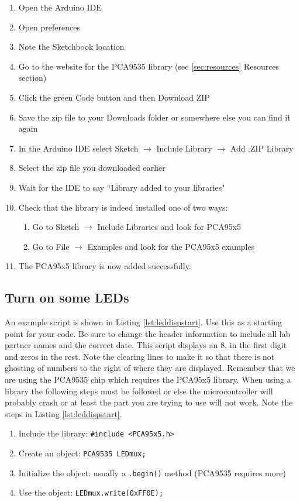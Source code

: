 \begin{enumerate}
    \item Open the Arduino IDE 
    \item Open preferences
    \item Note the Sketchbook location 
    \item Go to the website for the PCA9535 library (see \ref{sec:resources} Resources section)
    \item Click the green Code button and then Download ZIP
    \item Save the zip file to your Downloads folder or somewhere else you can find it again
    \item In the Arduino IDE select Sketch $\rightarrow$ Include Library $\rightarrow$ Add .ZIP Library
    \item Select the zip file you downloaded earlier
    \item Wait for the IDE to say ``Library added to your libraries"
    \item Check that the library is indeed installed one of two ways:
    \begin{enumerate}
        \item Go to Sketch $\rightarrow$ Include Libraries and look for PCA95x5
        \item Go to File $\rightarrow$ Examples and look for the PCA95x5 examples
    \end{enumerate}
    \item The PCA95x5 library is now added successfully.
\end{enumerate}

\subsection{Turn on some LEDs}
An example script is shown in Listing \ref{lst:leddispstart}. Use this as a starting point for your
code. Be sure to change the header information to include all lab partner names and the correct 
date. This script displays an 8. in the first digit and zeros in the rest. Note the clearing
lines to make it so that there is not ghosting of numbers to the right of where they are displayed. 
Remember that we are using the PCA9535 chip which requires the PCA95x5 library. When using a library 
the following steps must be followed or else the microcontroller will probably crash or at least 
the part you are trying to use will not work. Note the steps in Listing \ref{lst:leddispstart}.

\begin{enumerate}
    \item Include the library: \lstinline|#include <PCA95x5.h>|
    \item Create an object: \lstinline|PCA9535 LEDmux;|
    \item Initialize the object: usually a \lstinline|.begin()| method (PCA9535 requires more)
    \item Use the object: \lstinline|LEDmux.write(0xFF0E);|
\end{enumerate}

